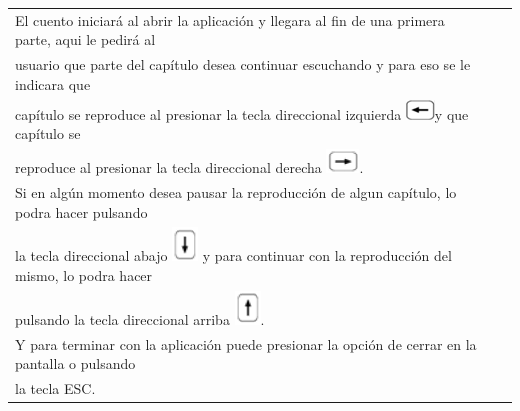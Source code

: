 \documentclass{book}
\begin{document}
\begin{tabular}{lll}

El cuento iniciar\'a al abrir la aplicaci\'on y llegara al fin de una primera parte, aqui le pedir\'a al\\
usuario que parte del cap\'itulo desea continuar escuchando y para eso se le indicara que \\
cap\'itulo se reproduce al presionar la tecla direccional izquierda  \includegraphics{iz}y que cap\'itulo se\\
reproduce al presionar la tecla direccional derecha  \includegraphics{der}.\\
Si en alg\'un momento desea pausar la reproducci\'on de algun cap\'itulo, lo podra hacer pulsando\\
la tecla direccional abajo  \includegraphics{ab} y para continuar con la reproducci\'on del mismo, lo podra hacer\\
pulsando la tecla direccional arriba  \includegraphics{arr}.\\
Y para terminar con la aplicaci\'on puede presionar la opci\'on de cerrar en la pantalla o pulsando\\
la tecla ESC.\\


\end{tabular}
\end{document}
